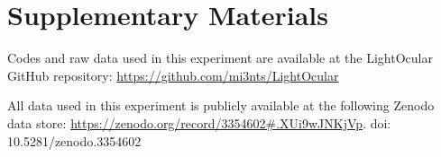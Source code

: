 \documentclass[10pt]{article}
\begin{document}
\section{Supplementary Materials}

Codes and raw data used in this experiment are available at the LightOcular GitHub repository: \url{https://github.com/mi3nts/LightOcular}

All data used in this experiment is publicly available at the following Zenodo data store: \url{https://zenodo.org/record/3354602#.XUi9wJNKjVp}. doi: 10.5281/zenodo.3354602

\vspace{6pt} 






\end{document}
